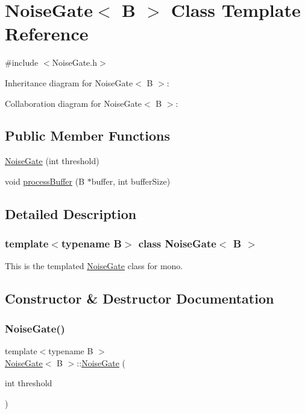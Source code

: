 \hypertarget{classNoiseGate}{}\section{Noise\+Gate$<$ B $>$ Class Template Reference}
\label{classNoiseGate}


{\ttfamily \#include $<$Noise\+Gate.\+h$>$}



Inheritance diagram for Noise\+Gate$<$ B $>$\+:


Collaboration diagram for Noise\+Gate$<$ B $>$\+:
\subsection*{Public Member Functions}
\begin{DoxyCompactItemize}
\item 
\hyperlink{classNoiseGate_a01dfe95cdebacc8b5f79e3bfd75ec2f2}{Noise\+Gate} (int threshold)
\item 
void \hyperlink{classNoiseGate_a19ac27671c5d22bfcde73c232f4864ed}{process\+Buffer} (B $\ast$buffer, int buffer\+Size)
\end{DoxyCompactItemize}


\subsection{Detailed Description}
\subsubsection*{template$<$typename B$>$\newline
class Noise\+Gate$<$ B $>$}

This is the templated \hyperlink{classNoiseGate}{Noise\+Gate} class for mono. 

\subsection{Constructor \& Destructor Documentation}
\mbox{\label{classNoiseGate_a01dfe95cdebacc8b5f79e3bfd75ec2f2}} 
\subsubsection{\texorpdfstring{Noise\+Gate()}{NoiseGate()}}
{\footnotesize\ttfamily template$<$typename B $>$ \\
\hyperlink{classNoiseGate}{Noise\+Gate}$<$ B $>$\+::\hyperlink{classNoiseGate}{Noise\+Gate} (\begin{DoxyParamCaption}\item[{int}]{threshold }\end{DoxyParamCaption})}

